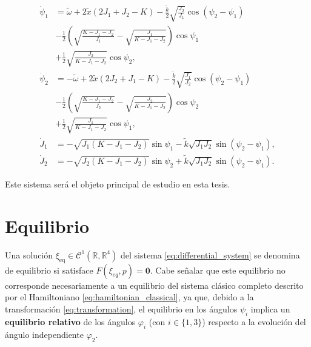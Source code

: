 \begin{equation}
    \begin{split}
        \dot{\psi}_1 & = \tilde{\omega} + 2 \tilde{x} (2J_1 + J_2 - K) - \frac{\tilde{k}}{2}  \sqrt{ \frac{J_2}{J_1} } \cos(\psi_2 - \psi_1)   \\
                     & - \frac{1}{2} \left( \sqrt{ \frac{K - J_1 - J_2}{J_1} } - \sqrt{\frac{J_1}{K - J_1 - J_2}} \right) \cos\psi_1           \\
                     & + \frac{1}{2} \sqrt{\frac{J_2}{K - J_1 - J_2}} \cos\psi_2,                                                              \\
        \dot{\psi}_2 & = - \tilde{\omega} + 2 \tilde{x} (2J_2 + J_1 - K) - \frac{\tilde{k}}{2}  \sqrt{ \frac{J_1}{J_2} } \cos(\psi_2 - \psi_1) \\
                     & - \frac{1}{2} \left( \sqrt{ \frac{K - J_1 - J_2}{J_2} } - \sqrt{\frac{J_2}{K - J_1 - J_2}} \right) \cos\psi_2           \\
                     & + \frac{1}{2} \sqrt{\frac{J_1}{K - J_1 - J_2}} \cos\psi_1,                                                              \\
        \dot{J}_1    & = - \sqrt{J_1(K - J_1 - J_2)} \sin\psi_1 - \tilde{k} \sqrt{J_1J_2} \sin(\psi_2 - \psi_1),                               \\
        \dot{J}_2    & = - \sqrt{J_2(K - J_1 - J_2)} \sin\psi_2 + \tilde{k} \sqrt{J_1J_2} \sin(\psi_2 - \psi_1).
    \end{split}
    \label{eq:dynamical_system}
\end{equation}

\noindent Este sistema será el objeto principal de estudio en esta tesis.

\section{Equilibrio}

Una solución $\xi_{\text{eq}} \in \mathcal{C}^1(\mathbb{R}, \mathbb{R}^4)$ del sistema
\eqref{eq:differential_system} se denomina de equilibrio si satisface $F(\xi_{eq}, p) = \textbf{0}$.
Cabe señalar que este equilibrio no corresponde necesariamente a un equilibrio del sistema clásico completo descrito por el Hamiltoniano
\eqref{eq:hamiltonian_classical}, ya que, debido a la transformación \eqref{eq:transformation},
el equilibrio en los ángulos $\psi_i$ implica un \textbf{equilibrio relativo} de los ángulos
$\varphi_i$ (con $i \in \{1,3\}$) respecto a la evolución del ángulo independiente $\varphi_2$.

